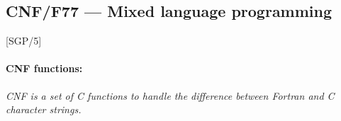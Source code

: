 \begin{description}
\end{description}

\newpage

\subsection{CNF/F77 --- Mixed language programming} 

\vspace{-9mm}

\hfill [SGP/5]

\vspace{2mm}

\paragraph{CNF functions:}\hfill

{\em CNF is a set of C functions to handle the difference between Fortran and C
character strings.}

